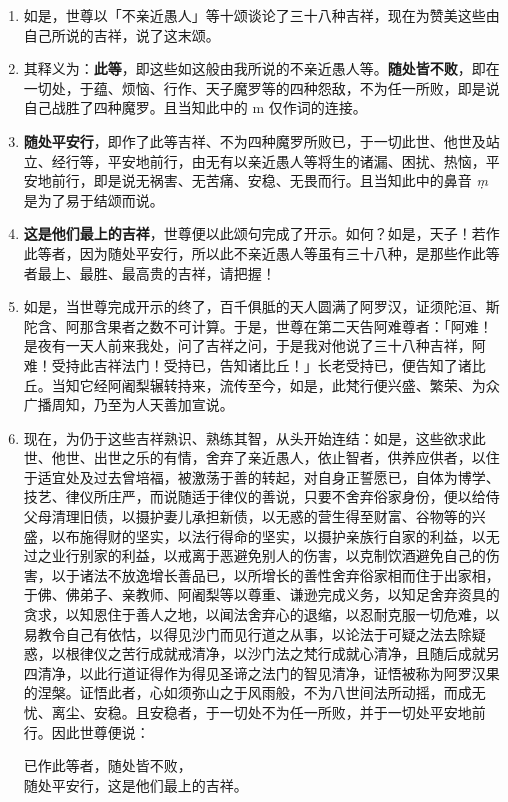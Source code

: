 \begin{enumerate}\item 如是，世尊以「不亲近愚人」等十颂谈论了三十八种吉祥，现在为赞美这些由自己所说的吉祥，说了这末颂。
\item 其释义为：\textbf{此等}，即这些如这般由我所说的不亲近愚人等。\textbf{随处皆不败}，即在一切处，于蕴、烦恼、行作、天子魔罗等的四种怨敌，不为任一所败，即是说自己战胜了四种魔罗。且当知此中的 m 仅作词的连接。
\item \textbf{随处平安行}，即作了此等吉祥、不为四种魔罗所败已，于一切此世、他世及站立、经行等，平安地前行，由无有以亲近愚人等将生的诸漏、困扰、热恼，平安地前行，即是说无祸害、无苦痛、安稳、无畏而行。且当知此中的鼻音 \textit{ṃ} 是为了易于结颂而说。
\item \textbf{这是他们最上的吉祥}，世尊便以此颂句完成了开示。如何？如是，天子！若作此等者，因为随处平安行，所以此不亲近愚人等虽有三十八种，是那些作此等者最上、最胜、最高贵的吉祥，请把握！
\item 如是，当世尊完成开示的终了，百千俱胝的天人圆满了阿罗汉，证须陀洹、斯陀含、阿那含果者之数不可计算。于是，世尊在第二天告阿难尊者：「阿难！是夜有一天人前来我处，问了吉祥之问，于是我对他说了三十八种吉祥，阿难！受持此吉祥法门！受持已，告知诸比丘！」长老受持已，便告知了诸比丘。当知它经阿阇梨辗转持来，流传至今，如是，此梵行便兴盛、繁荣、为众广播周知，乃至为人天善加宣说。
\item 现在，为仍于这些吉祥熟识、熟练其智，从头开始连结：如是，这些欲求此世、他世、出世之乐的有情，舍弃了亲近愚人，依止智者，供养应供者，以住于适宜处及过去曾培福，被激荡于善的转起，对自身正誓愿已，自体为博学、技艺、律仪所庄严，而说随适于律仪的善说，只要不舍弃俗家身份，便以给侍父母清理旧债，以摄护妻儿承担新债，以无惑的营生得至财富、谷物等的兴盛，以布施得财的坚实，以法行得命的坚实，以摄护亲族行自家的利益，以无过之业行别家的利益，以戒离于恶避免别人的伤害，以克制饮酒避免自己的伤害，以于诸法不放逸增长善品已，以所增长的善性舍弃俗家相而住于出家相，于佛、佛弟子、亲教师、阿阇梨等以尊重、谦逊完成义务，以知足舍弃资具的贪求，以知恩住于善人之地，以闻法舍弃心的退缩，以忍耐克服一切危难，以易教令自己有依怙，以得见沙门而见行道之从事，以论法于可疑之法去除疑惑，以根律仪之苦行成就戒清净，以沙门法之梵行成就心清净，且随后成就另四清净，以此行道证得作为得见圣谛之法门的智见清净，证悟被称为阿罗汉果的涅槃。证悟此者，心如须弥山之于风雨般，不为八世间法所动摇，而成无忧、离尘、安稳。且安稳者，于一切处不为任一所败，并于一切处平安地前行。因此世尊便说：\begin{quoting}已作此等者，随处皆不败，\\随处平安行，这是他们最上的吉祥。\end{quoting}\end{enumerate}

